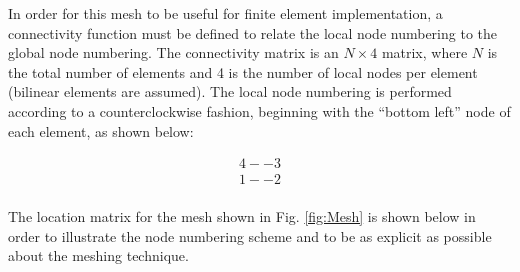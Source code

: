 \documentclass[10pt]{article}
\begin{document}
In order for this mesh to be useful for finite element implementation, a connectivity function must be defined to relate the local node numbering to the global node numbering. The connectivity matrix is an \(N\times4\) matrix, where \(N\) is the total number of elements and 4 is the number of local nodes per element (bilinear elements are assumed). The local node numbering is performed according to a counterclockwise fashion, beginning with the ``bottom left'' node of each element, as shown below:

\begin{equation}
\begin{aligned}
4 -- 3 \\
1 -- 2 \\
\end{aligned}
\end{equation}

The location matrix for the mesh shown in Fig. \ref{fig:Mesh} is shown below in order to illustrate the node numbering scheme and to be as explicit as possible about the meshing technique.
\end{document}
